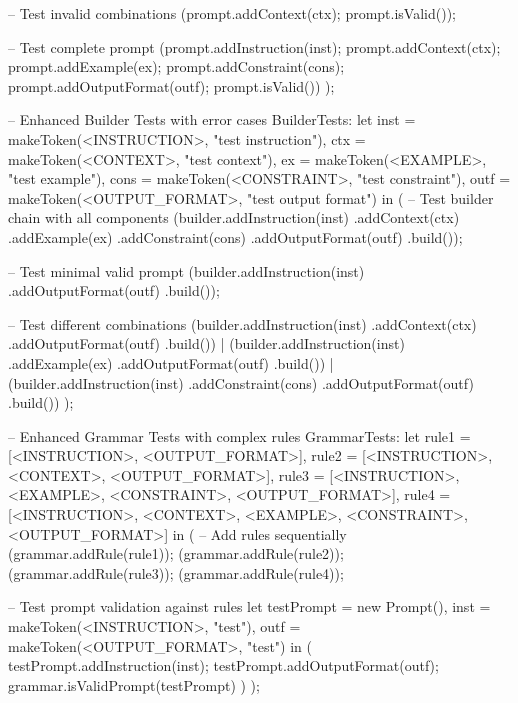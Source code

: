 \documentclass[a4paper]{article}
\begin{document}
\begin{vdm_al}
            -- Test invalid combinations
            (prompt.addContext(ctx);
             prompt.isValid());

            -- Test complete prompt
            (prompt.addInstruction(inst);
             prompt.addContext(ctx);
             prompt.addExample(ex);
             prompt.addConstraint(cons);
             prompt.addOutputFormat(outf);
             prompt.isValid())
        );

    -- Enhanced Builder Tests with error cases
    BuilderTests:
        let inst = makeToken(<INSTRUCTION>, "test instruction"),
            ctx = makeToken(<CONTEXT>, "test context"),
            ex = makeToken(<EXAMPLE>, "test example"),
            cons = makeToken(<CONSTRAINT>, "test constraint"),
            outf = makeToken(<OUTPUT_FORMAT>, "test output format") in
        (
            -- Test builder chain with all components
            (builder.addInstruction(inst)
                   .addContext(ctx)
                   .addExample(ex)
                   .addConstraint(cons)
                   .addOutputFormat(outf)
                   .build());

            -- Test minimal valid prompt
            (builder.addInstruction(inst)
                   .addOutputFormat(outf)
                   .build());

            -- Test different combinations
            (builder.addInstruction(inst)
                   .addContext(ctx)
                   .addOutputFormat(outf)
                   .build()) |
            (builder.addInstruction(inst)
                   .addExample(ex)
                   .addOutputFormat(outf)
                   .build()) |
            (builder.addInstruction(inst)
                   .addConstraint(cons)
                   .addOutputFormat(outf)
                   .build())
        );

    -- Enhanced Grammar Tests with complex rules
    GrammarTests:
        let rule1 = [<INSTRUCTION>, <OUTPUT_FORMAT>],
            rule2 = [<INSTRUCTION>, <CONTEXT>, <OUTPUT_FORMAT>],
            rule3 = [<INSTRUCTION>, <EXAMPLE>, <CONSTRAINT>, <OUTPUT_FORMAT>],
            rule4 = [<INSTRUCTION>, <CONTEXT>, <EXAMPLE>, <CONSTRAINT>, <OUTPUT_FORMAT>] in
        (
            -- Add rules sequentially
            (grammar.addRule(rule1));
            (grammar.addRule(rule2));
            (grammar.addRule(rule3));
            (grammar.addRule(rule4));

            -- Test prompt validation against rules
            let testPrompt = new Prompt(),
                inst = makeToken(<INSTRUCTION>, "test"),
                outf = makeToken(<OUTPUT_FORMAT>, "test") in
            (
                testPrompt.addInstruction(inst);
                testPrompt.addOutputFormat(outf);
                grammar.isValidPrompt(testPrompt)
            )
        );


\end{vdm_al}
\end{document}
